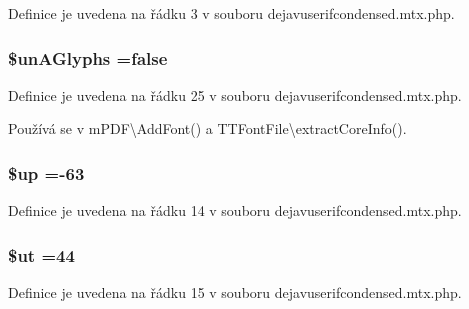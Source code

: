 Definice je uvedena na řádku 3 v souboru dejavuserifcondensed.\-mtx.\-php.

\hypertarget{dejavuserifcondensed_8mtx_8php_a0306ade62464a165fe9fa56306f6dd17}{
\subsubsection[{\$un\-A\-Glyphs}]{\setlength{\rightskip}{0pt plus 5cm}\$un\-A\-Glyphs ={\bf false}}}\label{dejavuserifcondensed_8mtx_8php_a0306ade62464a165fe9fa56306f6dd17}


Definice je uvedena na řádku 25 v souboru dejavuserifcondensed.\-mtx.\-php.



Používá se v m\-P\-D\-F\textbackslash{}\-Add\-Font() a T\-T\-Font\-File\textbackslash{}extract\-Core\-Info().

\hypertarget{dejavuserifcondensed_8mtx_8php_a6b5ad2ac55f9df46e8f34e78fbd6f176}{
\subsubsection[{\$up}]{\setlength{\rightskip}{0pt plus 5cm}\$up =-\/63}}\label{dejavuserifcondensed_8mtx_8php_a6b5ad2ac55f9df46e8f34e78fbd6f176}


Definice je uvedena na řádku 14 v souboru dejavuserifcondensed.\-mtx.\-php.

\hypertarget{dejavuserifcondensed_8mtx_8php_aadd3f841051043ee58e587e840e8dd0b}{
\subsubsection[{\$ut}]{\setlength{\rightskip}{0pt plus 5cm}\$ut =44}}\label{dejavuserifcondensed_8mtx_8php_aadd3f841051043ee58e587e840e8dd0b}


Definice je uvedena na řádku 15 v souboru dejavuserifcondensed.\-mtx.\-php.

